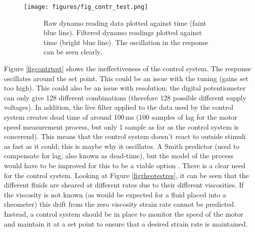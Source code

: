 \documentclass[twoside,a4]{report}
\def\br{\newline \newline \noindent}
\begin{document}
	\begin{figure}[!htb]
		\centering
		\texttt{[image: figures/fig\_contr\_test.png]}
		\caption{Controller Test}
		\label{figcontrtest}
		\begin{subfigure}{0.6\textwidth}
			\footnotesize Raw dynamo reading data plotted against time (faint blue line). Filtered dynamo readings plotted against time (bright blue line). The oscillation in the response can be seen clearly.
		\end{subfigure}
	\end{figure}
	
	\noindent
	Figure \ref{figcontrtest} shows the ineffectiveness of the control system. The response oscillates around the set point. This could be an issue with the tuning (gains set too high). This could also be an issue with resolution; the digital potentiometer can only give 128 different combinations (therefore 128 possible different supply voltages). In addition, the live filter applied to the data used by the control system creates dead time of around 100\,ms (100 samples of lag for the motor speed measurement process, but only 1 sample as far as the control system is concerend). This means that the control system doesn't react to outside stimuli as fast as it could; this is maybe why it oscillates. A Smith predictor (used to compensate for lag, also known as dead-time), but the model of the process would have to be improved for this to be a viable option \cite{smithref}.
	\br
	There is a clear need for the control system. Looking at Figure \ref{figrheotestres}, it can be seen that the different fluids are sheared at different rates due to their different viscosities. If the viscosity is not known (as would be expected for a fluid placed into a rheometer) this drift from the zero viscosity strain rate cannot be predicted. Instead, a control system should be in place to monitor the speed of the motor and maintain it at a set point to ensure that a desired strain rate is maintained.
	
\end{document}
